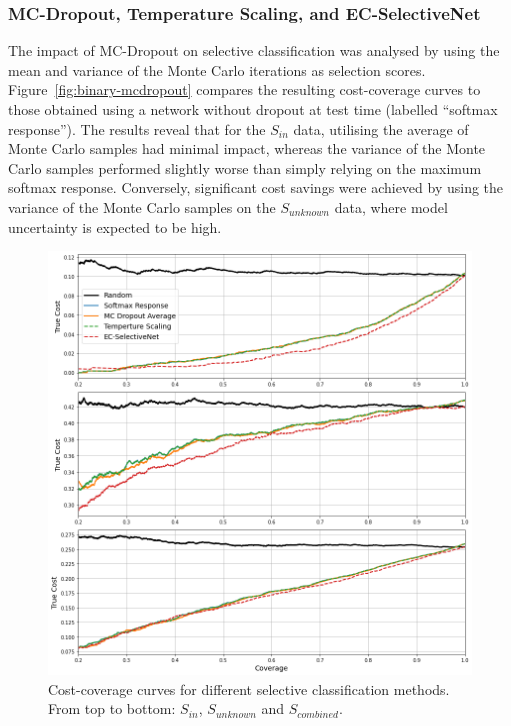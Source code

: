 \subsubsection{MC-Dropout, Temperature Scaling, and EC-SelectiveNet}
The impact of MC-Dropout on selective classification was analysed by using the mean and variance of the Monte Carlo iterations as selection scores. Figure~\ref{fig:binary-mcdropout} compares the resulting cost-coverage curves to those obtained using a network without dropout at test time (labelled “softmax response”). The results reveal that for the $S_{in}$ data, utilising the average of Monte Carlo samples had minimal impact, whereas the variance of the Monte Carlo samples performed slightly worse than simply relying on the maximum softmax response. Conversely, significant cost savings were achieved by using the variance of the Monte Carlo samples on the $S_{unknown}$ data, where model uncertainty is expected to be high.

\begin{figure}[!h]
	\centering
	\includegraphics[width=\textwidth]{images/binary_datasets.png}
	\caption{Cost-coverage curves for different selective classification methods. From top to bottom: $S_{in}$, $S_{unknown}$ and $S_{combined}$.}
	\label{fig:binary-datasets}
\end{figure}


